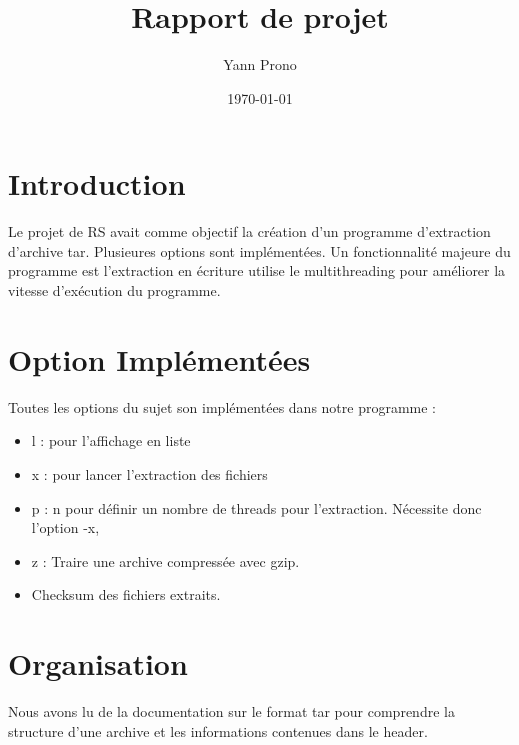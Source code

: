 \documentclass[a4paper,11pt, oneside]{book}
\title{Rapport de projet}
\author{Yann Prono}
\date{\today}
\begin{document}
	\begin{titlepage}
		
	\end{titlepage}

	\newpage

	\newpage\null\thispagestyle{empty}\newpage
	\setcounter{page}{1}

	\tableofcontents

	\newpage
	\chapter{Introduction}
	\par{
	Le projet de RS avait comme objectif la création d'un programme d'extraction d'archive tar. Plusieures options  sont implémentées. Un fonctionnalité majeure du programme est l'extraction en écriture utilise le  multithreading pour améliorer la vitesse d’exécution du programme. 
	}

	\newpage
	
	\chapter{Option Implémentées}

	\par{ Toutes les options du sujet son implémentées dans notre programme :

	}

	\begin{itemize}
    \item{l : pour l'affichage en liste}
    \item{x : pour lancer l'extraction des fichiers}
    \item{p : n pour définir un nombre de threads pour l'extraction. Nécessite donc l'option -x, }
    \item{z : Traire une archive compressée avec gzip.}
    \item{Checksum des fichiers extraits.}\newline

	\end{itemize}

	{\let\clearpage\relax\chapter{Organisation}}

	\par{Nous avons lu de la documentation sur le format tar pour comprendre la structure d'une archive et  les informations contenues dans le header.}
\end{document}
